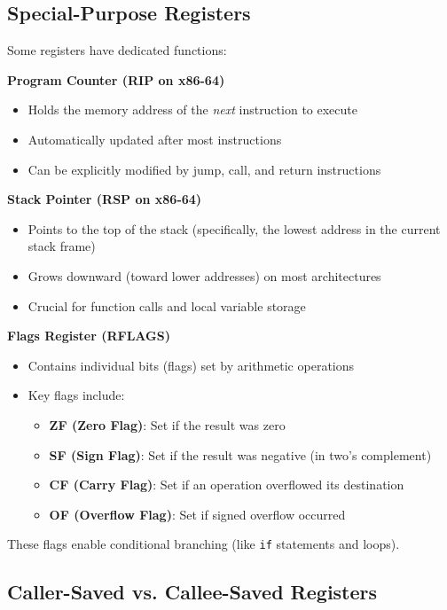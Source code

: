 \subsection{Special-Purpose Registers}

Some registers have dedicated functions:

\textbf{Program Counter (RIP on x86-64)}
\begin{itemize}
  \item Holds the memory address of the \emph{next} instruction to execute
  \item Automatically updated after most instructions
  \item Can be explicitly modified by jump, call, and return instructions
\end{itemize}

\textbf{Stack Pointer (RSP on x86-64)}
\begin{itemize}
  \item Points to the top of the stack (specifically, the lowest address in the current stack frame)
  \item Grows downward (toward lower addresses) on most architectures
  \item Crucial for function calls and local variable storage
\end{itemize}

\textbf{Flags Register (RFLAGS)}
\begin{itemize}
  \item Contains individual bits (flags) set by arithmetic operations
  \item Key flags include:
    \begin{itemize}
      \item \textbf{ZF (Zero Flag)}: Set if the result was zero
      \item \textbf{SF (Sign Flag)}: Set if the result was negative (in two's complement)
      \item \textbf{CF (Carry Flag)}: Set if an operation overflowed its destination
      \item \textbf{OF (Overflow Flag)}: Set if signed overflow occurred
    \end{itemize}
\end{itemize}

These flags enable conditional branching (like \texttt{if} statements and loops).

\subsection{Caller-Saved vs. Callee-Saved Registers}

